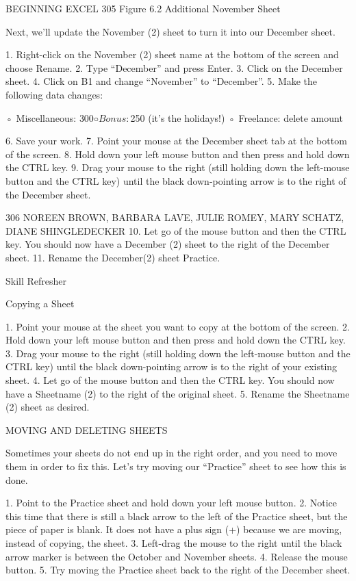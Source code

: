 BEGINNING EXCEL 305
Figure 6.2 Additional November Sheet


Next, we’ll update the November (2) sheet to turn it into our December sheet.

1.   Right-click on the November (2) sheet name at the bottom of the screen and choose Rename.
2.   Type “December” and press Enter.
3.   Click on the December sheet.
4.   Click on B1 and change “November” to “December”.
5.   Make the following data changes:

◦ Miscellaneous: $300
◦ Bonus: $250 (it’s the holidays!)
◦ Freelance: delete amount

6.   Save your work.
7.   Point your mouse at the December sheet tab at the bottom of the screen.
8.   Hold down your left mouse button and then press and hold down the CTRL key.
9.   Drag your mouse to the right (still holding down the left-mouse button and the CTRL key) until
the black down-pointing arrow is to the right of the December sheet.

306 NOREEN BROWN, BARBARA LAVE, JULIE ROMEY, MARY SCHATZ, DIANE SHINGLEDECKER
10. Let go of the mouse button and then the CTRL key. You should now have a December (2) sheet
to the right of the December sheet.
11. Rename the December(2) sheet Practice.


Skill Refresher


Copying a Sheet

1. Point your mouse at the sheet you want to copy at the bottom of the screen.
2. Hold down your left mouse button and then press and hold down the CTRL key.
3. Drag your mouse to the right (still holding down the left-mouse button and the CTRL key) until the black
down-pointing arrow is to the right of your existing sheet.
4. Let go of the mouse button and then the CTRL key. You should now have a Sheetname (2) to the right of
the original sheet.
5. Rename the Sheetname (2) sheet as desired.



MOVING AND DELETING SHEETS

Sometimes your sheets do not end up in the right order, and you need to move them in order to fix
this. Let’s try moving our “Practice” sheet to see how this is done.

1. Point to the Practice sheet and hold down your left mouse button.
2. Notice this time that there is still a black arrow to the left of the Practice sheet, but the piece of
paper is blank. It does not have a plus sign (+) because we are moving, instead of copying, the
sheet.
3. Left-drag the mouse to the right until the black arrow marker is between the October and
November sheets.
4. Release the mouse button.
5. Try moving the Practice sheet back to the right of the December sheet.

